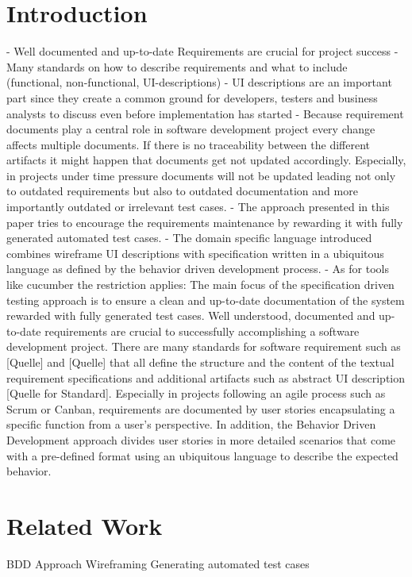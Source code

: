 \documentclass{sig-alternate-05-2015}
\begin{document}

\section{Introduction}
-	Well documented and up-to-date Requirements are crucial for project success
-	Many standards on how to describe requirements and what to include (functional, non-functional, UI-descriptions)
-	UI descriptions are an important part since they create a common ground for developers, testers and business analysts to discuss even before implementation has started
-	Because requirement documents play a central role in software development project every change affects multiple documents. If there is no traceability between the different artifacts it might happen that documents get not updated accordingly. Especially, in projects under time pressure documents will not be updated leading not only to outdated requirements but also to outdated documentation and more importantly outdated or irrelevant test cases.
-	The approach presented in this paper tries to encourage the requirements maintenance by rewarding it with fully generated automated test cases.
-	The domain specific language introduced combines wireframe UI descriptions with specification written in a ubiquitous language as defined by the behavior driven development process.
-	As for tools like cucumber the restriction applies: The main focus of the specification driven testing approach is to ensure a clean and up-to-date documentation of the system rewarded with fully generated test cases.
Well understood, documented and up-to-date requirements are crucial to successfully accomplishing a software development project.
There are many standards for software requirement such as [Quelle] and [Quelle] that all define the structure and the content of the textual requirement specifications and additional artifacts such as abstract UI description [Quelle for Standard].
Especially in projects following an agile process such as Scrum or Canban, requirements are documented by user stories encapsulating a specific function from a user’s perspective.
In addition, the Behavior Driven Development approach divides user stories in more detailed scenarios that come with a pre-defined format using an ubiquitous language to describe the expected behavior.


\section{Related Work}\label{sec:RelatedWork}
BDD Approach
Wireframing
Generating automated test cases
\end{document}
